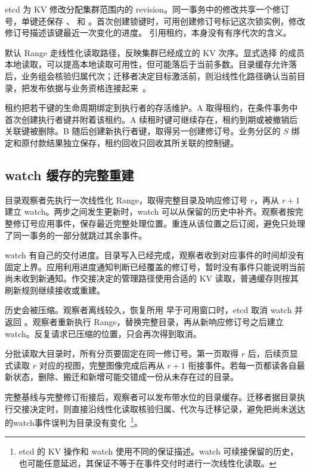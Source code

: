 etcd 为 KV 修改分配集群范围内的 revision。同一事务中的修改共享一个修订号，单键还保存 、 和 。首次创建锁键时，可用创建修订号标记这次锁实例，修改修订号描述该键最近一次变化的进度。 引用租约，本身没有有序代次的含义。

默认 Range 走线性化读取路径，反映集群已经成立的 KV 次序。显式选择  的成员本地读取，可以提高本地读取可用性，但可能落后于当前多数。目录缓存允许落后，业务组会核验归属代次；迁移者决定目标激活前，则沿线性化路径确认当前目录，把发布依据与业务资格连接起来~\cite{etcd-37-guarantees}。

租约把若干键的生命周期绑定到执行者的存活维护。A 取得租约，在条件事务中首次创建执行者键并附着该租约。A 续租时键可继续存在，租约到期或被撤销后关联键被删除。B 随后创建新执行者键，取得另一创建修订号。业务分区的 $S$ 绑定和原付款结果独立保存，租约回收只回收其所关联的控制键。

\subsection*{watch 缓存的完整重建}

目录观察者先执行一次线性化 Range，取得完整目录及响应修订号 $r$，再从 $r+1$ 建立 watch。两步之间发生更新时，watch 可以从保留的历史中补齐。观察者按完整修订号应用事件，保存最近完整处理位置。重连从该位置之后订阅，避免只处理了同一事务的一部分就跳过其余事件。


watch 有自己的交付进度。目录写入已经完成，观察者收到对应事件的时间却没有固定上界。应用利用进度通知判断已经覆盖的修订号，暂时没有事件只能说明当前尚未收到新通知。作交接决定的管理路径使用合适的 KV 读取，普通缓存则按其刷新规则继续接收或重建。

历史会被压缩。观察者离线较久，恢复所用  早于可用窗口时，etcd 取消 watch 并返回 。观察者重新执行 Range，替换完整目录，再从新响应修订号之后建立 watch。反复请求已压缩的位置，只会再次得到取消。

分批读取大目录时，所有分页要固定在同一修订号。第一页取得 $r$ 后，后续页显式读取 $r$ 对应的视图，完整图像完成后再从 $r+1$ 衔接事件。若每一页都读各自最新状态，删除、搬迁和新增可能交错成一份从未存在过的目录。

完整基线与完整修订衔接后，观察者可以发布带水位的目录缓存。迁移者据目录执行交接决定时，则直接沿线性化读取核验归属、代次与迁移记录，避免把尚未送达的watch事件误判为目录没有变化~\cite{etcd-37-api,etcd-37-guarantees}\footnote{etcd 的 KV 操作和 watch 使用不同的保证描述。watch 可续接保留的历史，也可能任意延迟，其保证不等于在事件交付时进行一次线性化读取。}。

